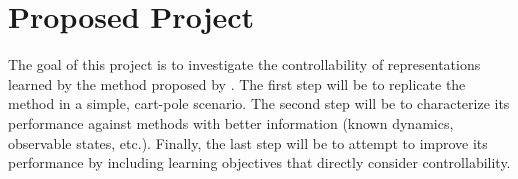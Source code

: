 \documentclass[12pt, letterpaper]{article}
\begin{document}
\section{Proposed Project}

The goal of this project is to investigate the controllability of representations learned by the method proposed by \cite{karl2016deep}. The first step will be to replicate the method in a simple, cart-pole scenario. The second step will be to characterize its performance against methods with better information (known dynamics, observable states, etc.). Finally, the last step will be to attempt to improve its performance by including learning objectives that directly consider controllability.



\end{document}
